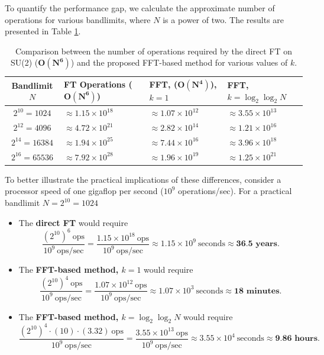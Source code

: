 \documentclass[11pt]{article}
\theoremstyle{definition}
\theoremstyle{remark}
\numberwithin{equation}{section}
\begin{document}
To quantify the performance gap, we calculate the approximate number of operations for various bandlimits, where $N$ is a power of two. The results are presented in Table \ref{tab:comparison}.

\begin{table}[H]
\centering
\caption{Comparison between the number of operations required by the direct FT on SU(2) ($\boldsymbol{O(N^6)}$) and the proposed FFT-based method for various values of $k$.}
\label{tab:comparison}
\begin{tabularx}{\textwidth}{|c|X|X|X|}
\hline
\rowcolor{red!15}
\textbf{Bandlimit $N$} & \textbf{FT Operations ($\boldsymbol{O(N^6)}$)} & \textbf{FFT,  ($\boldsymbol{O(N^4)}$), $k=1$} & \textbf{FFT, $k=\log_2 \log_2 N$ } \\
\hline

        \rowcolor{gray!10} 
$2^{10} = 1024$ & $\approx 1.15 \times 10^{18}$ & $\approx 1.07 \times 10^{12}$ & $\approx 3.55 \times 10^{13}$ \\
\rowcolor{gray!10}
$2^{12} = 4096$ & $\approx 4.72 \times 10^{21}$ & $\approx 2.82 \times 10^{14}$ & $\approx 1.21 \times 10^{16}$ \\
$2^{14} = 16384$ & $\approx 1.94 \times 10^{25}$ & $\approx 7.44 \times 10^{16}$ & $\approx 3.96 \times 10^{18}$ \\
\rowcolor{gray!10}
$2^{16} = 65536$ & $\approx 7.92 \times 10^{28}$ & $\approx 1.96 \times 10^{19}$ & $\approx 1.25 \times 10^{21}$ \\
\hline
\end{tabularx}
\end{table}

To better illustrate the practical implications of these differences, consider a processor speed of one gigaflop per second ($10^9$ operations/sec).  
For a practical bandlimit $N = 2^{10} = 1024$

\begin{itemize}
    \item The \textbf{direct FT} would require
    $$
    \frac{(2^{10})^6 \ \text{ops}}{10^9 \ \text{ops/sec}} 
    = \frac{1.15 \times 10^{18} \ \text{ops}}{10^9 \ \text{ops/sec}} 
    \approx 1.15 \times 10^{9} \ \text{seconds} \approx \textbf{36.5 years}.
    $$
    \item The \textbf{FFT-based method, $k=1$} would require
    $$
    \frac{(2^{10})^4 \ \text{ops}}{10^9 \ \text{ops/sec}} 
    = \frac{1.07 \times 10^{12} \ \text{ops}}{10^9 \ \text{ops/sec}} 
    \approx 1.07 \times 10^{3} \ \text{seconds} \approx \textbf{18 minutes}.
    $$
    \item The \textbf{FFT-based method, $k=\log_2 \log_2 N$} would require
    $$
    \frac{(2^{10})^4 \cdot (10) \cdot (3.32) \ \text{ops}}{10^9 \ \text{ops/sec}} 
    = \frac{3.55 \times 10^{13} \ \text{ops}}{10^9 \ \text{ops/sec}} 
    \approx 3.55 \times 10^{4} \ \text{seconds} \approx \textbf{9.86 hours}.
    $$
\end{itemize}
\end{document}
